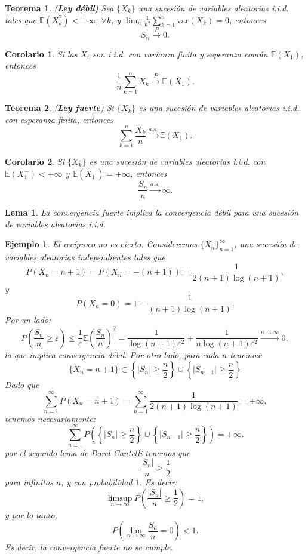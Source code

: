\documentclass{report}
\newtheorem{thm}{Teorema}[section]
\newtheorem{lem}{Lema}[section]
\newtheorem{cor}{Corolario}[thm]
\newtheorem{ej}{Ejemplo}[section]
\begin{document}
\begin{thm} \label{thm:ley_debil} (\textbf{Ley débil}) Sea $\{X_k\}$ una sucesión de variables aleatorias i.i.d.
    tales que $\mathbb{E}(X_k^2) < +\infty$, $\forall k$, y $\lim_n \frac{1}{n^2} \sum_{k=1}^n \mathrm{var}(X_k) = 0$, entonces
\[
S_n \xrightarrow{P} 0.
\]
\end{thm}

\begin{cor}
Si las \( X_i \) son \emph{i.i.d.} con varianza finita y esperanza común \( \mathbb{E}(X_1) \), entonces
\[
\frac{1}{n} \sum_{k=1}^n X_k \xrightarrow{P} \mathbb{E}(X_1).
\]
\end{cor}


\begin{thm} \label{thm:ley_fuerte} (\textbf{Ley fuerte}) Si $\{X_k\}$ es una sucesión de variables aleatorias i.i.d. con esperanza finita, entonces
\[
\sum_{k=1}^n \frac{X_k}{n} \xrightarrow{a.s.} \mathbb{E}(X_1).
\]
\end{thm}


\begin{cor} \label{cor:divergence_positive_infinite_mean}
Si $\{X_k\}$ es una sucesión de variables aleatorias i.i.d. con $\mathbb{E}(X_1^-) < +\infty$ y $\mathbb{E}(X_1^+) = +\infty$,
entonces $$\frac{S_n}{n} \xrightarrow{a.s.} \infty.$$
\end{cor}

\begin{lem}
    La convergencia fuerte implica la convergencia débil para una sucesión de variables aleatorias i.i.d.
\end{lem}

\begin{ej}
El recíproco no es cierto. Consideremos \( \{X_n\}_{n=1}^\infty \), una sucesión de variables aleatorias independientes tales que
\[
P(X_n = n+1) = P(X_n = -(n+1)) = \frac{1}{2(n+1)\log(n+1)},
\]
y
\[
P(X_n = 0) = 1 - \frac{1}{(n+1)\log(n+1)}.
\]
Por un lado:
$$
P\left(\frac{S_n}{n}\geq \varepsilon\right) \leq \frac{1}{\varepsilon}\mathbb{E}\left(\frac{S_n}{n}\right)^2 =
\frac{1}{\log(n+1)\varepsilon^2}+\frac{1}{n\log(n+1)\varepsilon^2} \xrightarrow{n\rightarrow\infty} 0,
$$
lo que implica convergencia débil. Por otro lado, para cada $n$ tenemos:
$$
\{X_n = n+1\} \subset \left\{ |S_n|\geq \frac{n}{2} \right\} \cup \left\{ |S_{n-1}|\geq \frac{n}{2} \right\}
$$
Dado que
\[
\sum_{n=1}^{\infty} P(X_n = n+1) = \sum_{n=1}^{\infty} \frac{1}{2(n+1)\log(n+1)} = +\infty,
\]
tenemos necesariamente:
\[
\sum_{n=1}^{\infty} P\left(\left\{ |S_n|\geq \frac{n}{2} \right\} \cup \left\{ |S_{n-1}|\geq \frac{n}{2} \right\} \right)  = +\infty.
\]
por el segundo lema de Borel-Cantelli tenemos que
\[
\frac{|S_n|}{n}\geq \frac{1}{2}
\]
para infinitos $n$, y con probabilidad $1$. Es decir:
\[
\limsup_{n \to \infty} P \left( \frac{|S_n|}{n} \geq \frac{1}{2} \right) = 1,
\]
y por lo tanto,
\[
P \left( \lim_{n \to \infty} \frac{S_n}{n} = 0 \right) < 1.
\]
Es decir, la convergencia fuerte no se cumple.
\end{ej}
\end{document}
